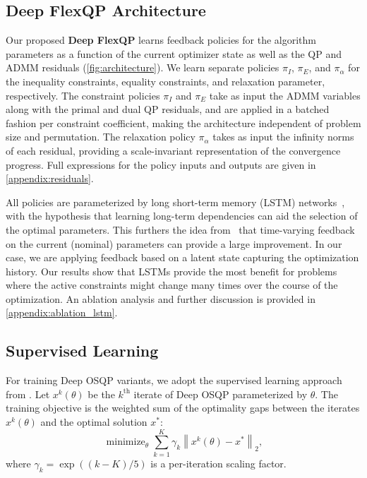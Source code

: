 \documentclass{article} %
\DeclareMathOperator*{\minimize}{minimize}
\newcommand{\norm}[1]{\left\lVert#1\right\rVert}
\begin{document}
\subsection{Deep FlexQP Architecture}
Our proposed {\color{green}\textbf{Deep FlexQP}} learns feedback policies for the algorithm parameters as a function of the current optimizer state as well as the QP and ADMM residuals (\cref{fig:architecture}). We learn separate policies $\pi_I$, $\pi_E$, and $\pi_\alpha$ for the inequality constraints, equality constraints, and relaxation parameter, respectively. The constraint policies $\pi_I$ and $\pi_E$ take as input the ADMM variables along with the primal and dual QP residuals, and are applied in a batched fashion per constraint coefficient, making the architecture independent of problem size and permutation. The relaxation policy $\pi_\alpha$ takes as input the infinity norms of each residual, providing a scale-invariant representation of the convergence progress. Full expressions for the policy inputs and outputs are given in \cref{appendix:residuals}.

All policies are parameterized by long short-term memory (LSTM) networks~\citep{hochreiter1997long}, with the hypothesis that learning long-term dependencies can aid the selection of the optimal parameters. This furthers the idea from~\citet{saravanos2025deep} that time-varying feedback on the current (nominal) parameters can provide a large improvement. In our case, we are applying feedback based on a latent state capturing the optimization history. Our results show that LSTMs provide the most benefit for problems where the active constraints might change many times over the course of the optimization. An ablation analysis and further discussion is provided in \cref{appendix:ablation_lstm}.

\subsection{Supervised Learning}

For training Deep OSQP variants, we adopt the supervised learning approach from \citet{saravanos2025deep}. Let $x^k(\theta)$ be the $k^\text{th}$ iterate of Deep OSQP parameterized by $\theta$. The training objective is the weighted sum of the optimality gaps between the iterates $x^k(\theta)$ and the optimal solution $x^*$:
\begin{equation} \label{eq:opt_gap_loss}
    \minimize_\theta \sum_{k = 1}^K \gamma_k \norm{x^k(\theta) - x^*}_2,
\end{equation}
where $\gamma_k = \exp((k - K) / 5)$ is a per-iteration scaling factor.
\end{document}

